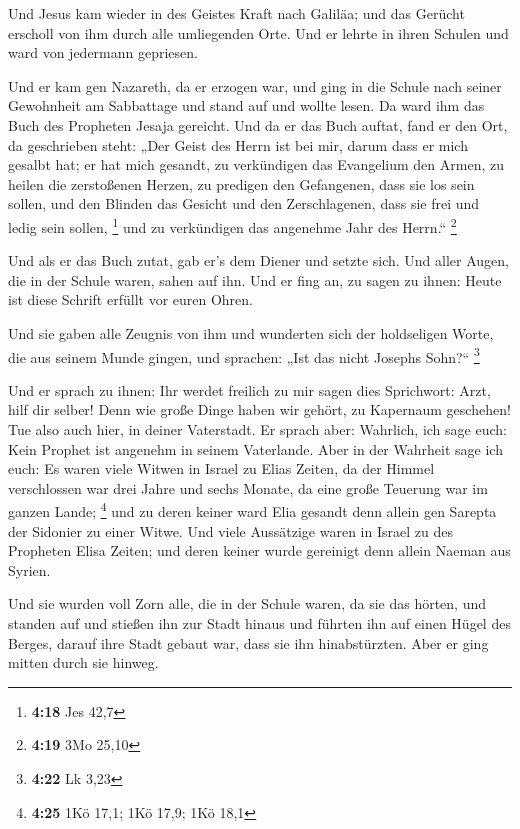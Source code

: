  Und Jesus kam wieder in des Geistes Kraft nach Galiläa;
und das Gerücht erscholl von ihm durch alle umliegenden Orte.
 Und er lehrte in ihren Schulen und ward von jedermann
gepriesen.

 Und er kam gen Nazareth, da er erzogen war, und ging in
die Schule nach seiner Gewohnheit am Sabbattage und stand auf und wollte
lesen.  Da ward ihm das Buch des Propheten Jesaja
gereicht. Und da er das Buch auftat, fand er den Ort, da geschrieben
steht:  „Der Geist des Herrn ist bei mir, darum dass er
mich gesalbt hat; er hat mich gesandt, zu verkündigen das Evangelium den
Armen, zu heilen die zerstoßenen Herzen, zu predigen den Gefangenen,
dass sie los sein sollen, und den Blinden das Gesicht und den
Zerschlagenen, dass sie frei und ledig sein sollen, \footnote{\textbf{4:18}
  Jes 42,7}  und zu verkündigen das angenehme Jahr des
Herrn.`` \footnote{\textbf{4:19} 3Mo 25,10}

 Und als er das Buch zutat, gab er's dem Diener und
setzte sich. Und aller Augen, die in der Schule waren, sahen auf ihn.
 Und er fing an, zu sagen zu ihnen: Heute ist diese
Schrift erfüllt vor euren Ohren.

 Und sie gaben alle Zeugnis von ihm und wunderten sich
der holdseligen Worte, die aus seinem Munde gingen, und sprachen: „Ist
das nicht Josephs Sohn?{}`` \footnote{\textbf{4:22} Lk 3,23}

 Und er sprach zu ihnen: Ihr werdet freilich zu mir sagen
dies Sprichwort: Arzt, hilf dir selber! Denn wie große Dinge haben wir
gehört, zu Kapernaum geschehen! Tue also auch hier, in deiner
Vaterstadt.  Er sprach aber: Wahrlich, ich sage euch:
Kein Prophet ist angenehm in seinem Vaterlande.  Aber in
der Wahrheit sage ich euch: Es waren viele Witwen in Israel zu Elias
Zeiten, da der Himmel verschlossen war drei Jahre und sechs Monate, da
eine große Teuerung war im ganzen Lande; \footnote{\textbf{4:25} 1Kö
  17,1; 1Kö 17,9; 1Kö 18,1}  und zu deren keiner ward
Elia gesandt denn allein gen Sarepta der Sidonier zu einer Witwe.
 Und viele Aussätzige waren in Israel zu des Propheten
Elisa Zeiten; und deren keiner wurde gereinigt denn allein Naeman aus
Syrien.

 Und sie wurden voll Zorn alle, die in der Schule waren,
da sie das hörten,  und standen auf und stießen ihn zur
Stadt hinaus und führten ihn auf einen Hügel des Berges, darauf ihre
Stadt gebaut war, dass sie ihn hinabstürzten.  Aber er
ging mitten durch sie hinweg.

